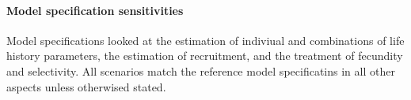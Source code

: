 \documentclass[11pt,
  english,
  a4paper,
]{article}
\begin{document}
\leavevmode\tagmcend\tagstructend\par


\hypertarget{model-specification-sensitivities}{%
\paragraph{Model specification sensitivities}\label{model-specification-sensitivities}}

\leavevmode\tagmcend\tagstructend


Model specifications looked at the estimation of indiviual and combinations of life history parameters, the estimation of recruitment, and the treatment of fecundity and selectivity. All scenarios match the reference model specificatins in all other aspects unless otherwised stated.

\leavevmode\tagmcend\tagstructend\par

\end{document}

